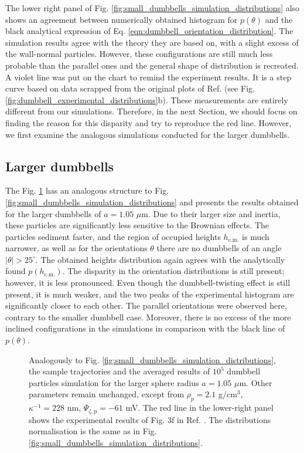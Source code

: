 \documentclass{master_thesis}
\begin{document}
The lower right panel of Fig. \ref{fig:small_dumbbells_simulation_distributions} also shows an agreement between numerically obtained histogram for $p(\theta)$ and the black analytical expression of Eq. \eqref{eqn:dumbbell_orientation_distribution}. The simulation results agree with the theory they are based on, with a slight excess of the wall-normal particles. However, these configurations are still much less probable than the parallel ones and the general shape of distribution is recreated. A violet line was put on the chart to remind the experiment results. It is a step curve based on data scrapped from the original plots of Ref. \cite{verweij2021} (see Fig. \ref{fig:dumbbell_experimental_distributions}b). These measurements are entirely different from our simulations. Therefore, in the next Section, we should focus on finding the reason for this disparity and try to reproduce the red line. However, we first examine the analogous simulations conducted for the larger dumbbells.

\subsection{Larger dumbbells}

The Fig. \ref{fig:large_dumbbells_simulation_distributions} has an analogous structure to Fig. \ref{fig:small_dumbbells_simulation_distributions} and presents the results obtained for the larger dumbbells of $a=1.05$ $\mu$m. Due to their larger size and inertia, these particles are significantly less sensitive to the Brownian effects. The particles sediment faster, and the region of occupied heights $h_{\textrm{c.m.}}$ is much narrower, as well as for the orientations $\theta$ there are no dumbbells of an angle $|\theta|>25^{\circ}$. The obtained heights distribution again agrees with the analytically found $p(h_{\textrm{c.m.}})$. The disparity in the orientation distributions is still present; however, it is less pronounced. Even though the dumbbell-twisting effect is still present, it is much weaker, and the two peaks of the experimental histogram are significantly closer to each other. The parallel orientations were observed here, contrary to the smaller dumbbell case. Moreover, there is no excess of the more inclined configurations in the simulations in comparison with the black line of $p(\theta)$.


\begin{figure}
    
    \caption{Analogously to Fig. \ref{fig:small_dumbbells_simulation_distributions}, the sample trajectories and the averaged results of $10^5$ dumbbell particles simulation for the larger sphere radius $a=1.05$ $\mu$m. Other parameters remain unchanged, except from $\rho_p = 2.1$ g/cm$^{3}$, $\kappa^{-1} = 228$ nm, $\Psi_{\zeta,\textrm{p}}=-61$ mV. The red line in the lower-right panel shows the experimental results of Fig. 3f in Ref. \cite{verweij2021}. The distributions normalisation is the same as in Fig. \ref{fig:small_dumbbells_simulation_distributions}.}
\label{fig:large_dumbbells_simulation_distributions}
\end{figure}
\end{document}
